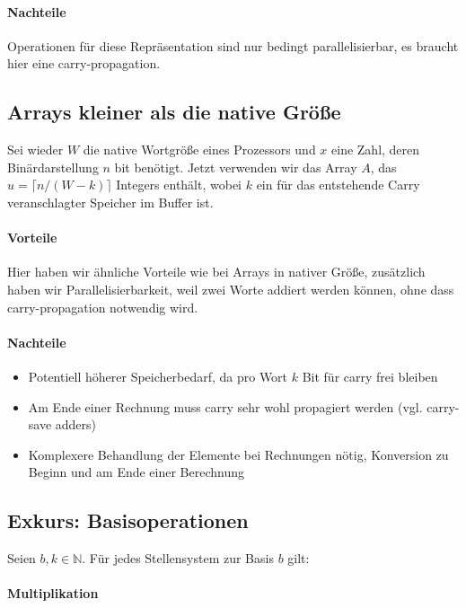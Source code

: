 \paragraph{Nachteile}

Operationen für diese Repräsentation sind nur bedingt parallelisierbar, es braucht hier eine carry-propagation.

\subsection{Arrays kleiner als die native Größe}

Sei wieder $W$ die native Wortgröße eines Prozessors und $x$ eine Zahl, deren Binärdarstellung $n$ bit benötigt. Jetzt verwenden wir das Array $A$, das 
$u = \lceil n/(W-k) \rceil$ Integers enthält, wobei $k$ ein für das entstehende Carry veranschlagter Speicher im Buffer ist.

\paragraph{Vorteile}

Hier haben wir ähnliche Vorteile wie bei Arrays in nativer Größe, zusätzlich haben wir Parallelisierbarkeit, weil zwei Worte addiert werden können, ohne dass carry-propagation 
notwendig wird.

\paragraph{Nachteile}

\begin{itemize}
    \item Potentiell höherer Speicherbedarf, da pro Wort $k$ Bit für carry frei bleiben
    \item Am Ende einer Rechnung muss carry sehr wohl propagiert werden (vgl. carry-save adders)
    \item Komplexere Behandlung der Elemente bei Rechnungen nötig, Konversion zu Beginn und am Ende einer Berechnung
\end{itemize}

\subsection{Exkurs: Basisoperationen}

Seien $b, k \in \mathbb{N}$. Für jedes Stellensystem zur Basis $b$ gilt:

\paragraph{Multiplikation}

